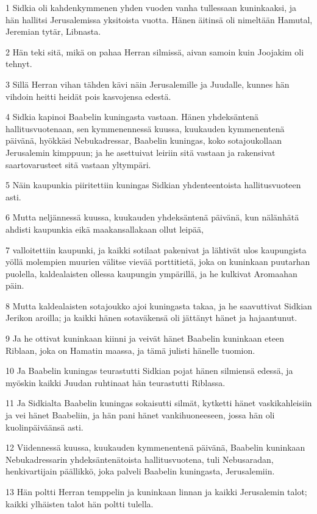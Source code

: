 \par 1 Sidkia oli kahdenkymmenen yhden vuoden vanha tullessaan kuninkaaksi, ja hän hallitsi Jerusalemissa yksitoista vuotta. Hänen äitinsä oli nimeltään Hamutal, Jeremian tytär, Libnasta.
\par 2 Hän teki sitä, mikä on pahaa Herran silmissä, aivan samoin kuin Joojakim oli tehnyt.
\par 3 Sillä Herran vihan tähden kävi näin Jerusalemille ja Juudalle, kunnes hän vihdoin heitti heidät pois kasvojensa edestä.
\par 4 Sidkia kapinoi Baabelin kuningasta vastaan. Hänen yhdeksäntenä hallitusvuotenaan, sen kymmenennessä kuussa, kuukauden kymmenentenä päivänä, hyökkäsi Nebukadressar, Baabelin kuningas, koko sotajoukollaan Jerusalemin kimppuun; ja he asettuivat leiriin sitä vastaan ja rakensivat saartovarusteet sitä vastaan yltympäri.
\par 5 Näin kaupunkia piiritettiin kuningas Sidkian yhdenteentoista hallitusvuoteen asti.
\par 6 Mutta neljännessä kuussa, kuukauden yhdeksäntenä päivänä, kun nälänhätä ahdisti kaupunkia eikä maakansallakaan ollut leipää,
\par 7 valloitettiin kaupunki, ja kaikki sotilaat pakenivat ja lähtivät ulos kaupungista yöllä molempien muurien välitse vievää porttitietä, joka on kuninkaan puutarhan puolella, kaldealaisten ollessa kaupungin ympärillä, ja he kulkivat Aromaahan päin.
\par 8 Mutta kaldealaisten sotajoukko ajoi kuningasta takaa, ja he saavuttivat Sidkian Jerikon aroilla; ja kaikki hänen sotaväkensä oli jättänyt hänet ja hajaantunut.
\par 9 Ja he ottivat kuninkaan kiinni ja veivät hänet Baabelin kuninkaan eteen Riblaan, joka on Hamatin maassa, ja tämä julisti hänelle tuomion.
\par 10 Ja Baabelin kuningas teurastutti Sidkian pojat hänen silmiensä edessä, ja myöskin kaikki Juudan ruhtinaat hän teurastutti Riblassa.
\par 11 Ja Sidkialta Baabelin kuningas sokaisutti silmät, kytketti hänet vaskikahleisiin ja vei hänet Baabeliin, ja hän pani hänet vankihuoneeseen, jossa hän oli kuolinpäiväänsä asti.
\par 12 Viidennessä kuussa, kuukauden kymmenentenä päivänä, Baabelin kuninkaan Nebukadressarin yhdeksäntenätoista hallitusvuotena, tuli Nebusaradan, henkivartijain päällikkö, joka palveli Baabelin kuningasta, Jerusalemiin.
\par 13 Hän poltti Herran temppelin ja kuninkaan linnan ja kaikki Jerusalemin talot; kaikki ylhäisten talot hän poltti tulella.
